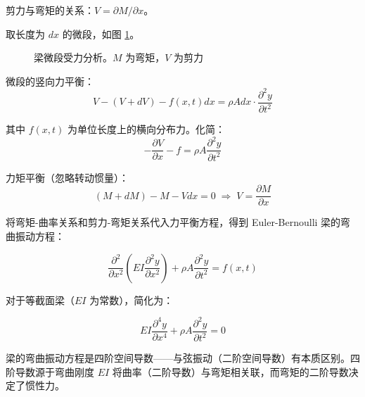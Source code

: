 剪力与弯矩的关系：$V = \partial M/\partial x$。

取长度为 $dx$ 的微段，如图 \ref{fig:beam-element}。

\begin{figure}[H]\centering
{}
\caption{梁微段受力分析。$M$ 为弯矩，$V$ 为剪力}
\label{fig:beam-element}
\end{figure}

微段的竖向力平衡：
\[
V - (V + dV) - f(x,t)dx = \rho A dx \cdot \frac{\partial^2 y}{\partial t^2}
\]

其中 $f(x,t)$ 为单位长度上的横向分布力。化简：
\[
-\frac{\partial V}{\partial x} - f = \rho A \frac{\partial^2 y}{\partial t^2}
\]

力矩平衡（忽略转动惯量）：
\[
(M + dM) - M - V dx = 0 \;\Rightarrow\; V = \frac{\partial M}{\partial x}
\]

将弯矩-曲率关系和剪力-弯矩关系代入力平衡方程，得到 Euler-Bernoulli 梁的弯曲振动方程：

\begin{myformula}
\[
\frac{\partial^2}{\partial x^2}\left(EI\frac{\partial^2 y}{\partial x^2}\right) + \rho A\frac{\partial^2 y}{\partial t^2} = f(x,t)
\]
\end{myformula}

对于等截面梁（$EI$ 为常数），简化为：

\begin{myformula}
\[
EI\frac{\partial^4 y}{\partial x^4} + \rho A\frac{\partial^2 y}{\partial t^2} = 0
\]
\end{myformula}

\begin{remark}
梁的弯曲振动方程是四阶空间导数——与弦振动（二阶空间导数）有本质区别。四阶导数源于弯曲刚度 $EI$ 将曲率（二阶导数）与弯矩相关联，而弯矩的二阶导数决定了惯性力。
\end{remark}

